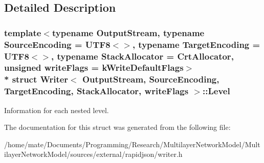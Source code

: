 \subsection{Detailed Description}
\subsubsection*{template$<$typename Output\+Stream, typename Source\+Encoding = U\+T\+F8$<$$>$, typename Target\+Encoding = U\+T\+F8$<$$>$, typename Stack\+Allocator = Crt\+Allocator, unsigned write\+Flags = k\+Write\+Default\+Flags$>$\\*
struct Writer$<$ Output\+Stream, Source\+Encoding, Target\+Encoding, Stack\+Allocator, write\+Flags $>$\+::\+Level}

Information for each nested level. 

The documentation for this struct was generated from the following file\+:\begin{DoxyCompactItemize}
\item 
/home/mate/\+Documents/\+Programming/\+Research/\+Multilayer\+Network\+Model/\+Multilayer\+Network\+Model/sources/external/rapidjson/writer.\+h\end{DoxyCompactItemize}
